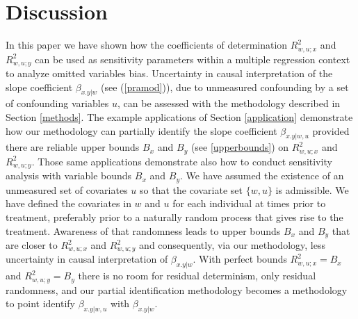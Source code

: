 \documentclass[11pt]{amsart}
\begin{document}
\newpage
\section{Discussion}
\label{discussion}
In this paper we have shown how the coefficients of determination $R^2_{w,u;x}$ and $R^2_{w,u;y}$ can be used as sensitivity parameters within a multiple regression context to analyze omitted variables bias. Uncertainty in causal interpretation of the slope coefficient $\beta_{x.y|w}$ (see (\ref{pramod})), due to unmeasured confounding by a set of confounding variables $u$, can be assessed with the methodology described in Section \ref{methods}. The example applications of Section \ref{application} demonstrate how our methodology can partially identify the slope coefficient $\beta_{x.y|w,u}$ provided there are reliable upper bounds $B_x$ and $B_y$ (see \ref{upperbounds}) on $R^2_{w,u;x}$ and $R^2_{w,u;y}$. Those same applications demonstrate also how to conduct sensitivity analysis with variable bounds $B_x$ and $B_y$. We have assumed the existence of an unmeasured set of covariates $u$ so that the covariate set $\{w,u\}$ is admissible. We have defined the covariates in $w$ and $u$ for each individual at times prior to treatment, preferably prior to a naturally random process that gives rise to the treatment. Awareness of that randomness leads to upper bounds $B_x$ and $B_y$ that are closer to $R^2_{w,u;x}$ and $R^2_{w,u;y}$ and consequently, via our methodology, less uncertainty in causal interpretation of $\beta_{x.y|w}$. With perfect bounds $R^2_{w,u;x}=B_x$ and $R^2_{w,u;y}=B_y$ there is no room for residual determinism, only residual randomness, and our partial identification methodology becomes a methodology to point identify $\beta_{x.y|w,u}$ with $\beta_{x.y|w}$.
\end{document}
